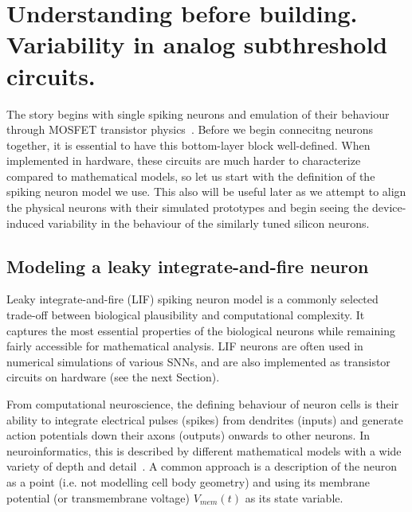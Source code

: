 \chapter{Understanding before building. Variability in analog subthreshold circuits.}
\label{ch:introduction_to_hardware}

The story begins with single spiking neurons and emulation of their behaviour through \ac{MOSFET} transistor physics~\cite{Chicca_etal14}. Before we begin connecitng neurons together, it is essential to have this bottom-layer block well-defined. When implemented in hardware, these circuits are much harder to characterize compared to mathematical models, so let us start with the definition of the spiking neuron model we use. This also will be useful later as we attempt to align the physical neurons with their simulated prototypes and begin seeing the device-induced variability in the behaviour of the similarly tuned silicon neurons.



\section{Modeling a leaky integrate-and-fire neuron}

Leaky integrate-and-fire (LIF) spiking neuron model is a commonly selected trade-off between biological plausibility and computational complexity. It captures the most essential properties of the biological neurons while remaining fairly accessible for mathematical analysis. LIF neurons are often used in numerical simulations of various SNNs, and are also implemented as transistor circuits on hardware (see the next Section).

From computational neuroscience, the defining behaviour of neuron cells is their ability to integrate electrical pulses (spikes) from dendrites (inputs) and generate action potentials down their axons (outputs) onwards to other neurons.
In neuroinformatics, this is described by different mathematical models with a wide variety of depth and detail~\cite{Izhikevich04}. A common approach is a description of the neuron as a point (i.e. not modelling cell body geometry) and using its membrane potential (or transmembrane voltage) $V_{mem}(t)$ as its state variable.

